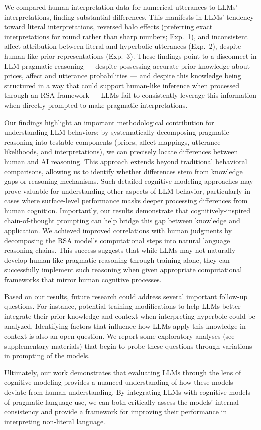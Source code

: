  We compared human interpretation data for numerical utterances to LLMs' interpretations, finding substantial differences.
This manifests in LLMs' tendency toward literal interpretations, reversed halo effects (preferring exact interpretations for round rather than sharp numbers; Exp.~1), and inconsistent affect attribution between literal and hyperbolic utterances (Exp.~2), despite human-like prior representations (Exp.~3).
These findings point to a disconnect in LLM pragmatic reasoning --- despite possessing accurate prior knowledge about prices, affect and utterance probabilities --- and despite this knowledge being structured in a way that could support human-like inference when processed through an RSA framework --- LLMs fail to consistently leverage this information when directly prompted to make pragmatic interpretations. 

Our findings highlight an important methodological contribution for understanding LLM behaviors: by systematically decomposing pragmatic reasoning into testable components (priors, affect mappings, utterance likelihoods, and interpretations), we can precisely locate differences between human and AI reasoning. 
This approach extends beyond traditional behavioral comparisons, allowing us to identify whether differences stem from knowledge gaps or reasoning mechanisms. Such detailed cognitive modeling approaches may prove valuable for understanding other aspects of LLM behavior, particularly in cases where surface-level performance masks deeper processing differences from human cognition.
Importantly, our results demonstrate that cognitively-inspired chain-of-thought prompting can help bridge this gap between knowledge and application. We achieved improved correlations with human judgments by decomposing the RSA model's computational steps into natural language reasoning chains. This success suggests that while LLMs may not naturally develop human-like pragmatic reasoning through training alone, they can successfully implement such reasoning when given appropriate computational frameworks that mirror human cognitive processes.

Based on our results, future research could address several important follow-up questions. For instance, potential training modifications to help LLMs better integrate their prior knowledge and context when interpreting hyperbole could be analyzed. Identifying factors that influence how LLMs apply this knowledge in context is also an open question. We report some exploratory analyses (see supplementary materials) that begin to probe these questions through variations in prompting of the models.

Ultimately, our work demonstrates that evaluating LLMs through the lens of cognitive modeling provides a nuanced understanding of how these models deviate from human understanding. By integrating LLMs with cognitive models of pragmatic language use, we can both critically assess the models' internal consistency and provide a framework for improving their performance in interpreting non-literal language.
